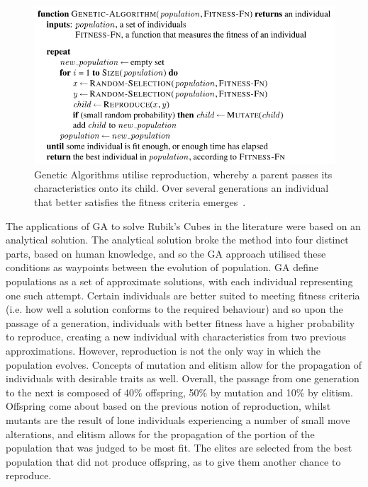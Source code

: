 \documentclass[UKenglish]{svproc}
\begin{document}
\begin{figure}[!h]
\begin{small}
\centering
\linespread{1.0}
\includegraphics[width=0.9\linewidth]{images/genetic-algorithm}
\caption{Genetic Algorithms utilise reproduction, whereby a parent passes its characteristics onto its child. Over several generations an individual that better satisfies the fitness criteria emerges~\cite{10.5555/1671238}.}
\label{fig:fig0}
\end{small}
\end{figure}

The applications of GA to solve Rubik's Cubes in the literature were based on an analytical solution. The analytical solution broke the method into four distinct parts, based on human knowledge, and so the GA approach utilised these conditions as waypoints between the evolution of population. GA define populations as a set of approximate solutions, with each individual representing one such attempt. Certain individuals are better suited to meeting fitness criteria (i.e. how well a solution conforms to the required behaviour) and so upon the passage of a generation, individuals with better fitness have a higher probability to reproduce, creating a new individual with characteristics from two previous approximations. However, reproduction is not the only way in which the population evolves. Concepts of mutation and elitism allow for the propagation of individuals with desirable traits as well. Overall, the passage from one generation to the next is composed of 40\% offspring, 50\% by mutation and 10\% by elitism. Offspring come about based on the previous notion of reproduction, whilst mutants are the result of lone individuals experiencing a number of small move alterations, and elitism allows for the propagation of the portion of the population that was judged to be most fit. The elites are selected from the best population that did not produce offspring, as to give them another chance to reproduce.
\end{document}
